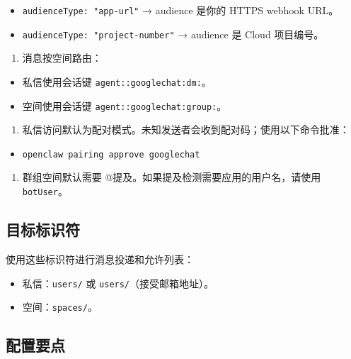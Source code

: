 \begin{itemize}
  \item \texttt{audienceType: "app-url"} → audience 是你的 HTTPS webhook URL。
  \item \texttt{audienceType: "project-number"} → audience 是 Cloud 项目编号。
\end{itemize}

\begin{enumerate}
  \item 消息按空间路由：
\end{enumerate}

\begin{itemize}
  \item 私信使用会话键 \texttt{agent::googlechat:dm:}。
  \item 空间使用会话键 \texttt{agent::googlechat:group:}。
\end{itemize}

\begin{enumerate}
  \item 私信访问默认为配对模式。未知发送者会收到配对码；使用以下命令批准：
\end{enumerate}

\begin{itemize}
  \item \texttt{openclaw pairing approve googlechat }
\end{itemize}

\begin{enumerate}
  \item 群组空间默认需要 @提及。如果提及检测需要应用的用户名，请使用 \texttt{botUser}。
\end{enumerate}


\subsection{目标标识符}


使用这些标识符进行消息投递和允许列表：

\begin{itemize}
  \item 私信：\texttt{users/} 或 \texttt{users/}（接受邮箱地址）。
  \item 空间：\texttt{spaces/}。
\end{itemize}


\subsection{配置要点}


